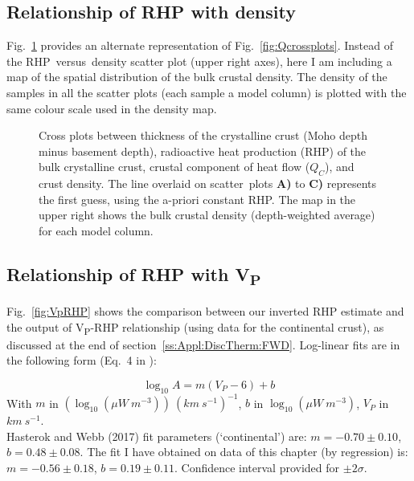 \begin{subappendices}
\subsection{Relationship of RHP with density}
\label{ss:ApplSup:Rel:Rho}

Fig.~\ref{fig:RhoRHP} provides an alternate representation of Fig.~\ref{fig:Qcrossplots}.
Instead of the RHP~versus~density scatter plot (upper right axes), here I am including a map of the spatial distribution of the bulk crustal density.
The density of the samples in all the scatter plots (each sample a model column) is plotted with the same colour scale used in the density map.

\begin{figure}
	\begin{adjustbox}{center}
	\end{adjustbox}
	\caption[Cross plots: crust thickness, RHP, crustal heat flow, crust density.]{Cross plots between thickness of the crystalline crust (Moho depth minus basement depth), radioactive heat production (RHP) of the bulk crystalline crust, crustal component of heat flow ($Q_C$), and crust density. The line overlaid on scatter~plots \textbf{A)} to \textbf{C)} represents the first guess, using the a-priori constant RHP.
	The map in the upper right shows the bulk crustal density (depth-weighted average) for each model column.}
	\label{fig:RhoRHP}
\end{figure}

\subsection[Relationship of RHP with VP]{Relationship of RHP with V\textsubscript{P}}
\label{ss:ApplSup:Rel:VP}

Fig.~\ref{fig:VpRHP} shows the comparison between our inverted RHP estimate and the output of \parencite{Hasterok2017_ign} V\textsubscript{P}-RHP relationship (using data for the continental crust), as discussed at the end of section~\ref{ss:Appl:DiscTherm:FWD}.
Log-linear fits are in the following form (Eq.~4 in \cite{Hasterok2017_ign}):

\begin{equation*}
	\log_{10} A = m (V_{P} - 6) + b
\end{equation*}
With $m$ in $(\log_{10} (\mu W \ m^{-3})) \ (km \ s^{-1})^{-1}$, $b$ in $\log_{10} (\mu W \ m^{-3})$, $V_{P}$ in $km \ s^{-1}$. \\
Hasterok and Webb (2017) fit parameters (`continental') are: $m = -0.70 \pm 0.10$, $b = 0.48 \pm 0.08$.
The fit I have obtained on data of this chapter (by regression) is: $m = -0.56 \pm 0.18$, $b = 0.19 \pm 0.11$.
Confidence interval provided for $\pm 2 \sigma$.


\end{subappendices}
